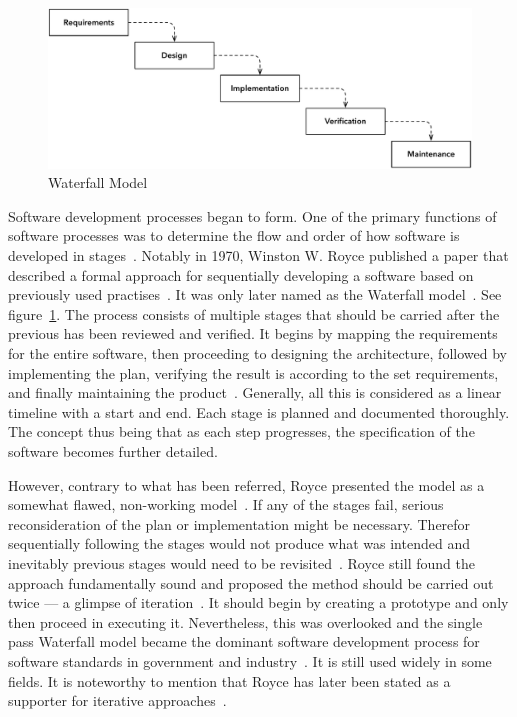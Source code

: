 \documentclass[english]{tktltiki2}
\begin{document}
\begin{figure}[h!]

    \centering
    \vspace{1cm}

    \includegraphics[width = \textwidth]{figures/waterfall-model}

    \caption{Waterfall Model}
    \label{figure:waterfall-model}

    \vspace{1cm}

\end{figure}

Software development processes began to form. One of the primary functions of software processes was to determine the flow and order of how software is developed in stages~\cite{Boe88}. Notably in 1970, Winston W. Royce published a paper that described a formal approach for sequentially developing a software based on previously used practises~\cite{Roy70}. It was only later named as the Waterfall model~\cite{Boe88, LB03}. See figure~\ref{figure:waterfall-model}. The process consists of multiple stages that should be carried after the previous has been reviewed and verified. It begins by mapping the requirements for the entire software, then proceeding to designing the architecture, followed by implementing the plan, verifying the result is according to the set requirements, and finally maintaining the product~\cite{Roy70}. Generally, all this is considered as a linear timeline with a start and end. Each stage is planned and documented thoroughly. The concept thus being that as each step progresses, the specification of the software becomes further detailed.

However, contrary to what has been referred, Royce presented the model as a somewhat flawed, non-working model~\cite{Roy70}. If any of the stages fail, serious reconsideration of the plan or implementation might be necessary. Therefor sequentially following the stages would not produce what was intended and inevitably previous stages would need to be revisited~\cite{Roy70}. Royce still found the approach fundamentally sound and proposed the method should be carried out twice — a glimpse of iteration~\cite{Roy70, Boe88}. It should begin by creating a prototype and only then proceed in executing it. Nevertheless, this was overlooked and the single pass Waterfall model became the dominant software development process for software standards in government and industry~\cite{Boe88, LB03}. It is still used widely in some fields. It is noteworthy to mention that Royce has later been stated as a supporter for iterative approaches~\cite{LB03}.
\end{document}

